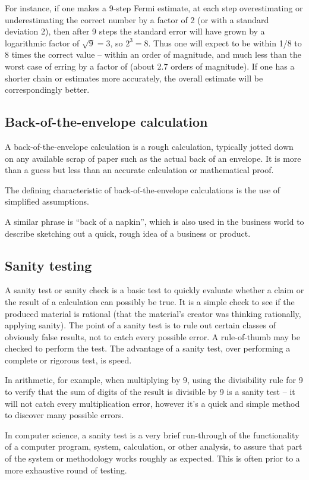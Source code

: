 For instance, if one makes a 9-step Fermi estimate, at each step overestimating or underestimating the correct number by a factor of 2 (or with a standard deviation 2), then after 9 steps the standard error will have grown by a logarithmic factor of $\sqrt{9} = 3$, so $2^3 = 8$. Thus one will expect to be within 1/8 to 8 times the correct value – within an order of magnitude, and much less than the worst case of erring by a factor of (about 2.7 orders of magnitude). If one has a shorter chain or estimates more accurately, the overall estimate will be correspondingly better.


\subsection{Back-of-the-envelope calculation}
A back-of-the-envelope calculation is a rough calculation, typically jotted down on any available scrap of paper such as the actual back of an envelope. It is more than a guess but less than an accurate calculation or mathematical proof.

The defining characteristic of back-of-the-envelope calculations is the use of simplified assumptions.

A similar phrase is ``back of a napkin'', which is also used in the business world to describe sketching out a quick, rough idea of a business or product.


\subsection{Sanity testing}
A sanity test or sanity check is a basic test to quickly evaluate whether a claim or the result of a calculation can possibly be true. It is a simple check to see if the produced material is rational (that the material's creator was thinking rationally, applying sanity). The point of a sanity test is to rule out certain classes of obviously false results, not to catch every possible error. A rule-of-thumb may be checked to perform the test. The advantage of a sanity test, over performing a complete or rigorous test, is speed.

In arithmetic, for example, when multiplying by 9, using the divisibility rule for 9 to verify that the sum of digits of the result is divisible by 9 is a sanity test -- it will not catch every multiplication error, however it's a quick and simple method to discover many possible errors.

In computer science, a sanity test is a very brief run-through of the functionality of a computer program, system, calculation, or other analysis, to assure that part of the system or methodology works roughly as expected. This is often prior to a more exhaustive round of testing.


